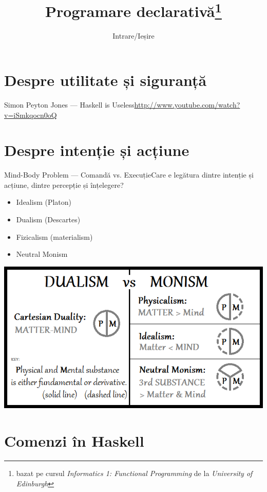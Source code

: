 \documentclass[xcolor=pdftex,romanian,colorlinks]{beamer}
\title[PD---Intrare/Ieșire]{Programare declarativă\thanks{bazat pe cursul \emph{Informatics 1: Functional Programming} de la \emph{University of Edinburgh}}}
\subtitle{Intrare/Ieșire}
\begin{document}
\begin{frame}
  \titlepage
\end{frame}

\section{Despre utilitate și siguranță}

\begin{frame}{Simon Peyton Jones --- Haskell is Useless}{\url{http://www.youtube.com/watch?v=iSmkqocn0oQ}}
\end{frame}

\section{Despre intenție și acțiune}

\begin{frame}{Mind-Body Problem --- Comandă vs. Execuție}{Care e legătura dintre intenție și acțiune, dintre percepție și înțelegere?}

\begin{minipage}{.4\columnwidth}
\begin{itemize}
\item Idealism (Platon)
\item Dualism (Descartes)
\item Fizicalism (materialism)
\item Neutral Monism
\end{itemize}
\end{minipage}
\begin{minipage}{.45\columnwidth}
\includegraphics[scale=.4]{Dualism-vs-Monism.png}
\end{minipage}
\end{frame}

\section{Comenzi în Haskell}
\end{document}
